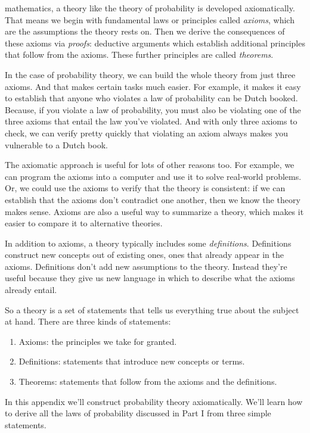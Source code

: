 \documentclass[justified]{tufte-book}
\providecommand{\tightlist}{%
  \setlength{\itemsep}{0pt}\setlength{\parskip}{0pt}}
\theoremstyle{definition}
\theoremstyle{definition}
\theoremstyle{definition}
\theoremstyle{remark}
\begin{document}
 mathematics, a theory like the theory of probability is
developed axiomatically. That means we begin with fundamental laws or
principles called \emph{axioms}, which are the assumptions the theory
rests on. Then we derive the consequences of these axioms via
\emph{proofs}: deductive arguments which establish additional principles
that follow from the axioms. These further principles are called
\emph{theorems}.

In the case of probability theory, we can build the whole theory from
just three axioms. And that makes certain tasks much easier. For
example, it makes it easy to establish that anyone who violates a law of
probability can be Dutch booked. Because, if you violate a law of
probability, you must also be violating one of the three axioms that
entail the law you've violated. And with only three axioms to check, we
can verify pretty quickly that violating an axiom always makes you
vulnerable to a Dutch book.

The axiomatic approach is useful for lots of other reasons too. For
example, we can program the axioms into a computer and use it to solve
real-world problems. Or, we could use the axioms to verify that the
theory is consistent: if we can establish that the axioms don't
contradict one another, then we know the theory makes sense. Axioms are
also a useful way to summarize a theory, which makes it easier to
compare it to alternative theories.

In addition to axioms, a theory typically includes some
\emph{definitions}. Definitions construct new concepts out of existing
ones, ones that already appear in the axioms. Definitions don't add new
assumptions to the theory. Instead they're useful because they give us
new language in which to describe what the axioms already entail.

So a theory is a set of statements that tells us everything true about
the subject at hand. There are three kinds of statements:

\begin{enumerate}
\def\labelenumi{\arabic{enumi}.}
\tightlist
\item
  Axioms: the principles we take for granted.
\item
  Definitions: statements that introduce new concepts or terms.
\item
  Theorems: statements that follow from the axioms and the definitions.
\end{enumerate}

In this appendix we'll construct probability theory axiomatically. We'll
learn how to derive all the laws of probability discussed in Part I from
three simple statements.
\end{document}
